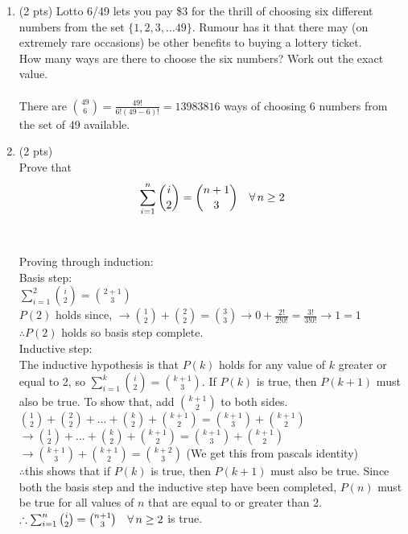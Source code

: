 \documentclass[12pt]{article}
\begin{document}
\begin{enumerate}
\item (2 pts)
Lotto 6/49 lets you pay \$3 for the thrill of choosing six different numbers from the set \(\lbrace1,2,3, \dots 49  \rbrace\).   Rumour has it that there may (on extremely rare occasions) be other benefits to buying a lottery ticket.\\
How many ways are there to choose the six numbers?  Work out the exact value.\\
\\There are $\binom{49}{6} = \frac{49!}{6!(49-6)!} = 13983816$ ways of choosing 6 numbers from the set of 49 available.


\item (2 pts) \\
Prove that \[\sum_{i=1}^{n} \binom{i}{2}= \binom{n+1}{3} \quad \forall \thinspace n \geq 2\]\\
\\Proving through induction:
\\Basis step:
\\$\sum_{i=1}^{2} \binom{i}{2}= \binom{2+1}{3}$
\\$P(2)$ holds since, $\rightarrow \binom{1}{2} + \binom{2}{2}= \binom{3}{3} \rightarrow 0 + \frac{2!}{2!0!}=\frac{3!}{3!0!} \rightarrow 1 = 1$
\\$\therefore P(2)$ holds so basis step complete.
\\Inductive step:
\\The inductive hypothesis is that $P(k)$ holds for any value of $k$ greater or equal to 2, so $\sum_{i=1}^{k} \binom{i}{2}= \binom{k+1}{3}$. If $P(k)$ is true, then $P(k+1)$ must also be true. To show that, add $\binom{k+1}{2}$ to both sides.
\\$\binom{1}{2} + \binom{2}{2}+...+\binom{k}{2} + \binom{k+1}{2}=\binom{k+1}{3}+ \binom{k+1}{2}$
\\$\rightarrow \binom{1}{2} + ... +\binom{k}{2}  + \binom{k+1}{2} = \binom{k+1}{3} + \binom{k+1}{2}$
\\$\rightarrow \binom{k+1}{3} + \binom{k+1}{2} = \binom{k+2}{3}$ (We get this from pascals identity)
\\$\therefore$this shows that if $P(k)$ is true, then $P(k+1)$ must also be true. Since both the basis step and the inductive step have been completed, $P(n)$ must be true for all values of $n$ that are equal to or greater than 2. $\therefore \sum_{i=1}^{n} \binom{i}{2}= \binom{n+1}{3} \quad \forall \thinspace n \geq 2$ is true.



\end{enumerate}
\end{document}
